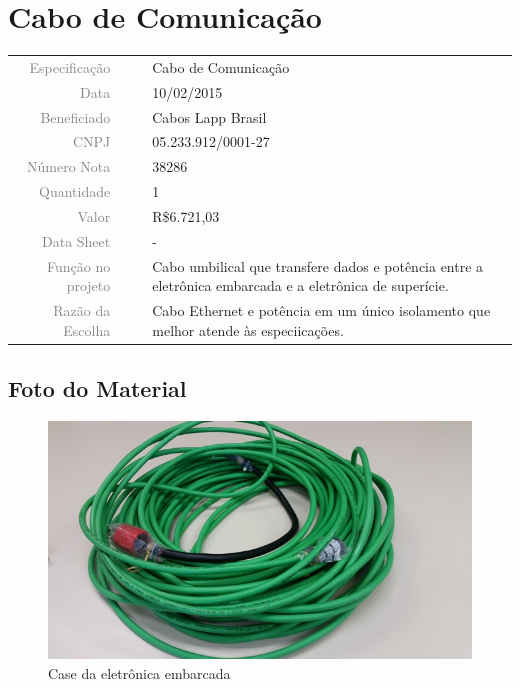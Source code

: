 \section{Cabo de Comunicação}
\label{cabo_01}


\begin{table}[ht!]

	\begin{tabular}{r l|l p{12cm} }
		
		\textcolor{gray}{Especificação} &&& 	{Cabo de Comunicação}\\
		\textcolor{gray}{Data} &&& 				{10/02/2015}\\
        \textcolor{gray}{Beneficiado} &&&		{Cabos Lapp Brasil}\\
        \textcolor{gray}{CNPJ} &&& 				{05.233.912/0001-27}\\
        \textcolor{gray}{Número Nota} &&& 		{38286}\\
		\textcolor{gray}{Quantidade} &&& 		{1}\\
		\textcolor{gray}{Valor} &&& 			{R\$6.721,03}\\
		\textcolor{gray}{Data Sheet} &&& 		{-}\\

		\textcolor{gray}{Função no projeto} &&& {Cabo umbilical que transfere dados e
		potência entre a eletrônica embarcada e a eletrônica de superície.}\\
		\textcolor{gray}{Razão da Escolha} &&& {Cabo Ethernet e potência em um único
		isolamento que melhor atende às especiicações.}

	\end{tabular}
\end{table}

\newpage
\subsection{Foto do Material}
\begin{figure}[H]
 \centering
 \includegraphics[width=1\columnwidth]{CaboComm/foto.jpg}
 \caption{Case da eletrônica embarcada}
\end{figure}

